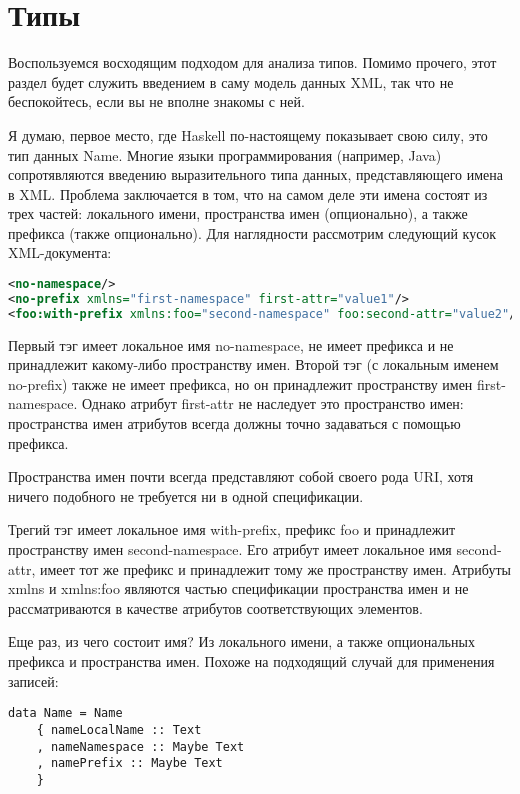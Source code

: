 \section{Типы} %

Воспользуемся восходящим подходом для анализа типов. Помимо прочего, этот раздел будет служить введением в саму модель данных XML, так что не беспокойтесь, если вы не вполне знакомы с ней.

Я думаю, первое место, где Haskell по-настоящему показывает свою силу, это тип данных Name. Многие языки программирования (например, Java) сопротявляются введению выразительного типа данных, представляющего имена в XML. Проблема заключается в том, что на самом деле эти имена состоят из трех частей: локального имени, пространства имен (опционально), а также префикса (также опционально). Для наглядности рассмотрим следующий кусок XML-документа:

\begin{lstlisting}[language=XML]
<no-namespace/>
<no-prefix xmlns="first-namespace" first-attr="value1"/>
<foo:with-prefix xmlns:foo="second-namespace" foo:second-attr="value2"/>
\end{lstlisting}

Первый тэг имеет локальное имя no-namespace, не имеет префикса и не принадлежит какому-либо пространству имен. Второй тэг (с локальным именем no-prefix) также не имеет префикса, но он принадлежит пространству имен first-namespace. Однако атрибут first-attr не наследует это пространство имен: пространства имен атрибутов всегда должны точно задаваться с помощью префикса.

\begin{remark}
Пространства имен почти всегда представляют собой своего рода URI, хотя ничего подобного не требуется ни в одной спецификации.
\end{remark}

Трегий тэг имеет локальное имя with-prefix, префикс foo и принадлежит пространству имен second-namespace. Его атрибут имеет локальное имя second-attr, имеет тот же префикс и принадлежит тому же пространству имен. Атрибуты xmlns и xmlns:foo являются частью спецификации пространства имен и не рассматриваются в качестве атрибутов соответствующих элементов.

Еще раз, из чего состоит имя? Из локального имени, а также опциональных префикса и пространства имен. Похоже на подходящий случай для применения записей:

\begin{lstlisting}
data Name = Name
    { nameLocalName :: Text
    , nameNamespace :: Maybe Text
    , namePrefix :: Maybe Text
    }
\end{lstlisting}

